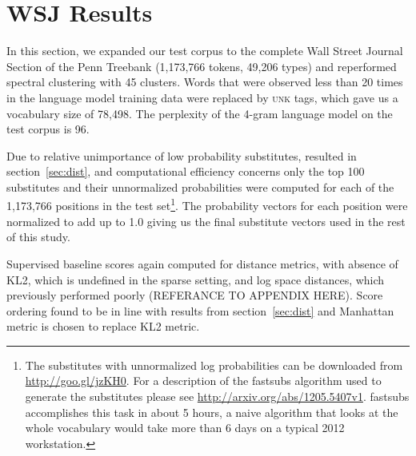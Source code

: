\section{WSJ Results}
\label{sec:wsj}

In this section, we expanded our test corpus to the complete Wall
Street Journal Section of the Penn Treebank \cite{treebank3}
(1,173,766 tokens, 49,206 types) and reperformed spectral clustering
with 45 clusters.
%
Words that were observed less than 20 times in the language model
training data were replaced by \textsc{unk} tags, which gave us a
vocabulary size of 78,498.
%
The perplexity of the 4-gram language model on the test corpus is 96.

Due to relative unimportance of low probability substitutes, resulted
in section~\ref{sec:dist}, and computational efficiency concerns only
the top 100 substitutes and their unnormalized probabilities were
computed for each of the 1,173,766 positions in the test
set\footnote{The substitutes with unnormalized log probabilities can
  be downloaded from \mbox{\url{http://goo.gl/jzKH0}}.  For a
  description of the {\sc fastsubs} algorithm used to generate the
  substitutes please see
  \mbox{\url{http://arxiv.org/abs/1205.5407v1}}.  {\sc fastsubs}
  accomplishes this task in about 5 hours, a naive algorithm that
  looks at the whole vocabulary would take more than 6 days on a
  typical 2012 workstation.}.  The probability vectors for each
position were normalized to add up to 1.0 giving us the final
substitute vectors used in the rest of this study.

Supervised baseline scores again computed for distance metrics, with
absence of KL2, which is undefined in the sparse setting, and log
space distances, which previously performed poorly (REFERANCE TO
APPENDIX HERE). Score ordering found to be in line with results from
section~\ref{sec:dist} and Manhattan metric is chosen to replace KL2
metric.


